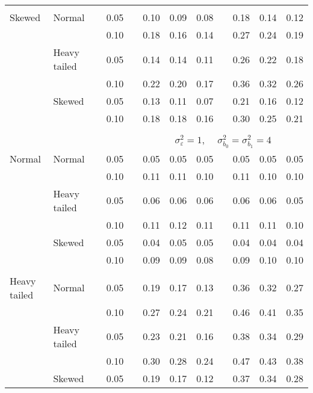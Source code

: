 \begin{table}[ht]
\begin{scriptsize}
\begin{center}
\begin{tabular}{ll p{.1cm} c p{.1cm} rrr p{.1cm} rrr}
             &&&&&&&&&&&\\ 
Skewed       & Normal       && 0.05 &&  0.10 & 0.09 & 0.08 && 0.18 & 0.14 & 0.12 \\ 
             &              && 0.10 &&  0.18 & 0.16 & 0.14 && 0.27 & 0.24 & 0.19 \\ 
             & Heavy tailed && 0.05 &&  0.14 & 0.14 & 0.11 && 0.26 & 0.22 & 0.18 \\ 
             &              && 0.10 &&  0.22 & 0.20 & 0.17 && 0.36 & 0.32 & 0.26 \\ 
             & Skewed       && 0.05 &&  0.13 & 0.11 & 0.07 && 0.21 & 0.16 & 0.12 \\ 
             &              && 0.10 &&  0.18 & 0.18 & 0.16 && 0.30 & 0.25 & 0.21 \\ 


&&&&&&&&&&&\\
& && && \multicolumn{7}{c}{$\sigma_{\varepsilon}^2 = 1$, \ \ $\sigma_{b_0}^2 = \sigma_{b_1}^2 = 4$} \\ \cline{6-12}
\rowcolor{gray!20}Normal       & Normal       && 0.05 &&  0.05 & 0.05 & 0.05 && 0.05 & 0.05 & 0.05 \\ 
\rowcolor{gray!20}             &              && 0.10 &&  0.11 & 0.11 & 0.10 && 0.11 & 0.10 & 0.10 \\ 
\rowcolor{gray!20}             & Heavy tailed && 0.05 &&  0.06 & 0.06 & 0.06 && 0.06 & 0.06 & 0.05 \\ 
\rowcolor{gray!20}             &              && 0.10 &&  0.11 & 0.12 & 0.11 && 0.11 & 0.11 & 0.10 \\ 
\rowcolor{gray!20}             & Skewed       && 0.05 &&  0.04 & 0.05 & 0.05 && 0.04 & 0.04 & 0.04 \\ 
\rowcolor{gray!20}             &              && 0.10 &&  0.09 & 0.09 & 0.08 && 0.09 & 0.10 & 0.10 \\ 
             &&&&&&&&&&&\\
Heavy tailed & Normal       && 0.05 &&  0.19 & 0.17 & 0.13 && 0.36 & 0.32 & 0.27 \\ 
             &              && 0.10 &&  0.27 & 0.24 & 0.21 && 0.46 & 0.41 & 0.35 \\ 
             & Heavy tailed && 0.05 &&  0.23 & 0.21 & 0.16 && 0.38 & 0.34 & 0.29 \\ 
             &              && 0.10 &&  0.30 & 0.28 & 0.24 && 0.47 & 0.43 & 0.38 \\ 
             & Skewed       && 0.05 &&  0.19 & 0.17 & 0.12 && 0.37 & 0.34 & 0.28 \\ 

\end{tabular}
\end{center}
\end{scriptsize}
\end{table}
